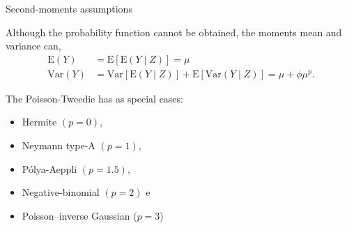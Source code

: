 \documentclass[11pt]{beamer}\usepackage[]{graphicx}\usepackage[]{color}
\begin{document}
\begin{frame}{Second-moments assumptions}

  Although the probability function cannot be obtained, the moments mean
  and variance can,
  $$
  \begin{aligned}
    \text{E}(Y)   &= \text{E}[\text{E}(Y \mid Z)] = \mu \\
    \text{Var}(Y) &= \text{Var}[\text{E}(Y \mid Z)] +
    \text{E}[\text{Var}(Y \mid Z)] = \mu + \phi\mu^p.
  \end{aligned}
  $$
  \vspace{0.3cm}

  The Poisson-Tweedie has as special cases:
  \begin{itemize}
    \item Hermite $(p=0)$,
    \item Neymann type-A $(p=1)$,
    \item Pólya-Aeppli $(p=1.5)$,
    \item Negative-binomial $(p=2)$ e
    \item Poisson--inverse Gaussian ($p=3$)
  \end{itemize}
\end{frame}
\end{document}
